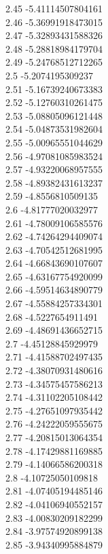 {2.45	-5.41114507804161\\
2.46	-5.36991918473015\\
2.47	-5.32893431588326\\
2.48	-5.28818984179704\\
2.49	-5.24768512712265\\
2.5	-5.2074195309237\\
2.51	-5.16739240673383\\
2.52	-5.12760310261475\\
2.53	-5.08805096121448\\
2.54	-5.04873531982604\\
2.55	-5.00965551044629\\
2.56	-4.97081085983524\\
2.57	-4.93220068957555\\
2.58	-4.89382431613237\\
2.59	-4.8556810509135\\
2.6	-4.81777020032977\\
2.61	-4.78009106585576\\
2.62	-4.74264294409074\\
2.63	-4.70542512681995\\
2.64	-4.66843690107607\\
2.65	-4.63167754920099\\
2.66	-4.59514634890779\\
2.67	-4.55884257334301\\
2.68	-4.5227654911491\\
2.69	-4.48691436652715\\
2.7	-4.45128845929979\\
2.71	-4.41588702497435\\
2.72	-4.38070931480616\\
2.73	-4.34575457586213\\
2.74	-4.31102205108442\\
2.75	-4.27651097935442\\
2.76	-4.24222059555675\\
2.77	-4.20815013064354\\
2.78	-4.17429881169885\\
2.79	-4.14066586200318\\
2.8	-4.10725050109818\\
2.81	-4.07405194485146\\
2.82	-4.04106940552157\\
2.83	-4.00830209182299\\
2.84	-3.97574920899138\\
2.85	-3.94340995884879\\
}
